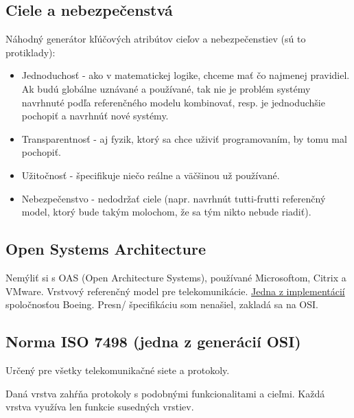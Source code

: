 \documentclass[10pt,a4paper]{article}
\begin{document}
\subsection{Ciele a nebezpečenstvá}   
Náhodný generátor kľúčových atribútov cieľov a nebezpečenstiev (sú to protiklady):
\begin{itemize}
\item Jednoduchosť - ako v matematickej logike, chceme mať čo najmenej pravidiel. Ak budú globálne uznávané a používané, tak nie je problém systémy navrhnuté podľa referenčného modelu kombinovať, resp. je jednoduchšie pochopiť a navrhnúť nové systémy. 
\item Transparentnosť - aj fyzik, ktorý sa chce uživiť programovaním, by tomu mal pochopiť.
\item Užitočnosť - špecifikuje niečo reálne a väčšinou už používané.
\item Nebezpečenstvo - nedodržať ciele (napr. navrhnút tutti-frutti referenčný model, ktorý bude takým molochom, že sa tým nikto nebude riadiť). 
\end{itemize}

\subsection{Open Systems Architecture} 
Nemýliť si s OAS (Open Architecture Systems), používané Microsoftom, Citrix a VMware. 
Vrstvový referenčný model pre telekomunikácie. \href{www.acq.osd.mil/osjtf/pdf/boeing.pdf}{Jedna z implementácií} spoločnosťou Boeing. 
Presn/ špecifikáciu som nenašiel, zakladá sa na OSI. 

\subsection{Norma ISO 7498 (jedna z generácií OSI)}    
\label{OSI}

Určený pre všetky telekomunikačné siete a protokoly. 

Daná vrstva zahŕňa protokoly s podobnými funkcionalitami a cieľmi. Každá vrstva využíva len funkcie susedných vrstiev. 
\end{document}
